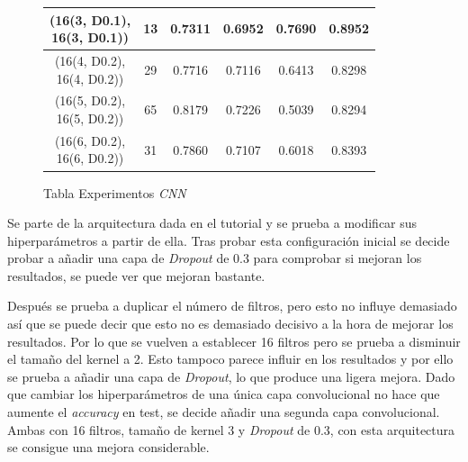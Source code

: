 \documentclass{uc3mpracticas}
\begin{document}
\begin{figure}[!h]
\begin{center}
\begin{tabular}{|c|c|c|c|c|c|}
        \makecell{(16(3, D0.1), \\ 16(3, D0.1))} & 13   &  0.7311                                  &  0.6952                         &  0.7690                              &  0.8952            \\ \hline
        \makecell{(16(4, D0.2), \\ 16(4, D0.2))} & 29   &  0.7716                                  &  0.7116                         &  0.6413                              &  0.8298            \\ \hline
        \rowcolor{LightGreen}
        \makecell{(16(5, D0.2), \\ 16(5, D0.2))}& 65   &  0.8179                                  &  0.7226                         &  0.5039                              &  0.8294            \\ \hline
        \makecell{(16(6, D0.2), \\ 16(6, D0.2))} & 31   &  0.7860                                  &  0.7107                         &  0.6018                              &  0.8393            \\ \hline
  \end{tabular}
\end{center}
\caption*{Tabla Experimentos \textit{CNN}}
\end{figure}


Se parte de la arquitectura dada en el tutorial y se prueba a modificar sus hiperparámetros a partir de ella. Tras probar esta configuración inicial se decide probar a añadir una capa de \textit{Dropout} de 0.3 para comprobar si mejoran los resultados, se puede ver que mejoran bastante.

\vspace{2mm}

Después se prueba a duplicar el número de filtros, pero esto no influye demasiado así que se puede decir que esto no es demasiado decisivo a la hora de mejorar los resultados. Por lo que se vuelven a establecer 16 filtros pero se prueba a disminuir el tamaño del kernel a 2. Esto tampoco parece influir en los resultados y por ello se prueba a añadir una capa de \textit{Dropout}, lo que produce una ligera mejora. Dado que cambiar los hiperparámetros de una única capa convolucional no hace que aumente el \textit{accuracy} en test, se decide añadir una segunda capa convolucional. Ambas con 16 filtros, tamaño de kernel 3 y \textit{Dropout} de 0.3, con esta arquitectura se consigue una mejora considerable.

\vspace{2mm}
\end{document}
